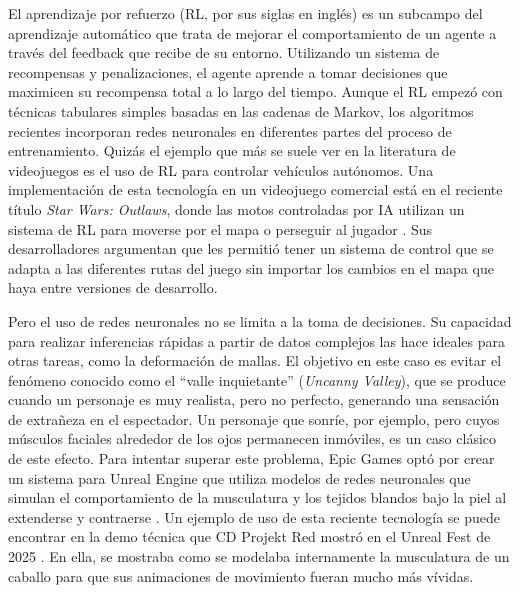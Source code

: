 El aprendizaje por refuerzo (RL, por sus siglas en inglés) es un subcampo del aprendizaje automático que trata de mejorar el comportamiento de un agente a través del feedback que recibe de su entorno. Utilizando un sistema de recompensas y penalizaciones, el agente aprende a tomar decisiones que maximicen su recompensa total a lo largo del tiempo. Aunque el RL empezó con técnicas tabulares simples basadas en las cadenas de Markov, los algoritmos recientes incorporan redes neuronales en diferentes partes del proceso \cite{ghasemi_comprehensive_2025} de entrenamiento. Quizás el ejemplo que más se suele ver en la literatura de videojuegos es el uso de RL para controlar vehículos autónomos. Una implementación de esta tecnología en un videojuego comercial está en el reciente título \textit{Star Wars: Outlaws}, donde las motos controladas por IA utilizan un sistema de RL para moverse por el mapa o perseguir al jugador \cite{gaudreau_game_2025}. Sus desarrolladores argumentan que les permitió tener un sistema de control que se adapta a las diferentes rutas del juego sin importar los cambios en el mapa que haya entre versiones de desarrollo.

Pero el uso de redes neuronales no se limita a la toma de decisiones. Su capacidad para realizar inferencias rápidas a partir de datos complejos las hace ideales para otras tareas, como la deformación de mallas. El objetivo en este caso es evitar el fenómeno conocido como el ``valle inquietante'' (\textit{Uncanny Valley}), que se produce cuando un personaje es muy realista, pero no perfecto, generando una sensación de extrañeza en el espectador. Un personaje que sonríe, por ejemplo, pero cuyos músculos faciales alrededor de los ojos permanecen inmóviles, es un caso clásico de este efecto. Para intentar superar este problema, Epic Games optó por crear un sistema para Unreal Engine que utiliza modelos de redes neuronales que simulan el comportamiento de la musculatura y los tejidos blandos bajo la piel al extenderse y contraerse \cite{epic_games_ml_2025}. Un ejemplo de uso de esta reciente tecnología se puede encontrar en la demo técnica que CD Projekt Red mostró en el Unreal Fest de 2025 \cite{cd_projekt_red_witcher_2025}. En ella, se mostraba como se modelaba internamente la musculatura de un caballo para que sus animaciones de movimiento fueran mucho más vívidas.



